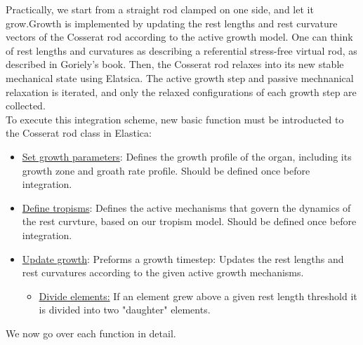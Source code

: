 \documentclass[a4paper, 11pt]{article}
\begin{document}
Practically, we start from a straight rod clamped on one side, and let it grow.Growth is implemented by updating the rest lengths and rest curvature vectors of the Cosserat rod according to the active growth model. One can think of rest lengths and curvatures as describing a referential stress-free virtual rod, as described in Goriely's book. Then, the Cosserat rod relaxes into its new stable mechanical state using Elatsica. The active growth step and passive mechnanical relaxation is iterated, and only the relaxed configurations of each growth step are collected.\\
To execute this integration scheme, new basic function must be introducted to the Cosserat rod class in Elastica:
\begin{itemize}
    \item \underline{Set growth parameters}: Defines the growth profile of the organ, including its growth zone and groath rate profile. Should be defined once before integration.
    \item \underline{Define tropisms}: Defines the active mechanisms that govern the dynamics of the rest curvture, based on our tropism model. Should be defined once before integration.
    \item \underline{Update growth}: Preforms a growth timestep: Updates the rest lengths and rest curvatures according to the given active growth mechanisms.
    \begin{itemize}
        \item \underline{Divide elements:} If an element grew above a given rest length threshold it is divided into two "daughter" elements. 
    \end{itemize}
   
\end{itemize} 
We now go over each function in detail. 
\end{document}
